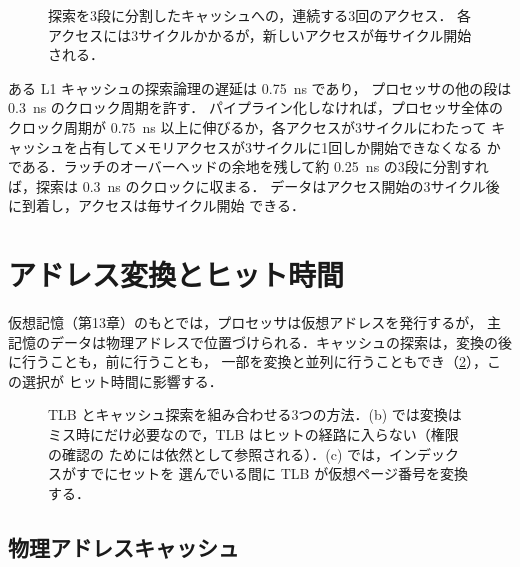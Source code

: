 \documentclass[../main.tex]{subfiles}
\begin{document}
\begin{figure}[htbp]
  \centering
  
  \caption{探索を3段に分割したキャッシュへの，連続する3回のアクセス．
    各アクセスには3サイクルかかるが，新しいアクセスが毎サイクル開始される．}
  \label{fig:l14-pipelined}
\end{figure}

\begin{example}
  \label{ex:l14-pipelined}
  ある L1 キャッシュの探索論理の遅延は \SI{0.75}{\nano\second} であり，
  プロセッサの他の段は \SI{0.3}{\nano\second} のクロック周期を許す．
  パイプライン化しなければ，プロセッサ全体のクロック周期が
  \SI{0.75}{\nano\second} 以上に伸びるか，各アクセスが3サイクルにわたって
  キャッシュを占有してメモリアクセスが3サイクルに1回しか開始できなくなる
  かである．ラッチのオーバーヘッドの余地を残して約 \SI{0.25}{\nano\second}
  の3段に分割すれば，探索は \SI{0.3}{\nano\second} のクロックに収まる．
  データはアクセス開始の3サイクル後に到着し，アクセスは毎サイクル開始
  できる．
\end{example}

\section{アドレス変換とヒット時間}
\label{sec:l14-translation}

仮想記憶（第13章）のもとでは，プロセッサは仮想アドレスを発行するが，
主記憶のデータは物理アドレスで位置づけられる．キャッシュの探索は，変換の後に行うことも，前に行うことも，
一部を変換と並列に行うこともでき（\cref{fig:l14-translation}），この選択が
ヒット時間に影響する．

\begin{figure}[htbp]
  \centering
  
  \caption{TLB とキャッシュ探索を組み合わせる3つの方法．(b) では変換は
    ミス時にだけ必要なので，TLB はヒットの経路に入らない（権限の確認の
    ためには依然として参照される）．(c) では，インデックスがすでにセットを
    選んでいる間に TLB が仮想ページ番号を変換する．}
  \label{fig:l14-translation}
\end{figure}

\subsection{物理アドレスキャッシュ}
\end{document}
